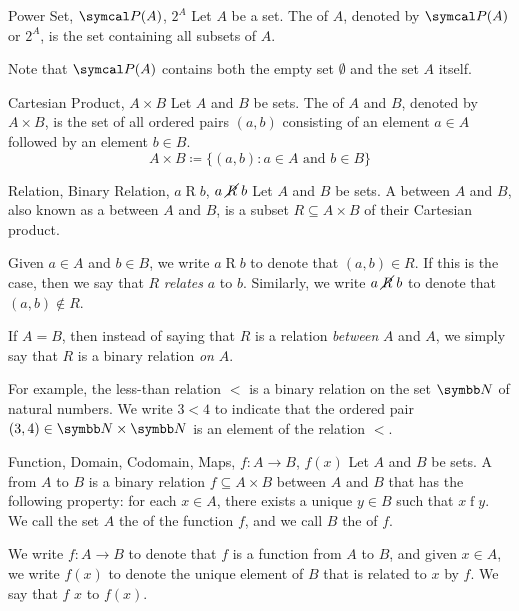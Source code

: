 \documentclass[12pt]{report}
\begin{document}
\begin{dfnbox}{Power Set, $\powerset(A)$, $2^A$}
	Let $A$ be a set. The  of $A$, denoted by $\powerset(A)$ or $2^A$, is the set containing all subsets of $A$.
\end{dfnbox}

Note that $\powerset(A)$ contains both the empty set $\emptyset$ and the set $A$ itself.

\begin{dfnbox}{Cartesian Product, $A \times B$}
	Let $A$ and $B$ be sets. The  of $A$ and $B$, denoted by $A \times B$, is the set of all ordered pairs $(a, b)$ consisting of an element $a \in A$ followed by an element $b \in B$.
	\[ A \times B \coloneq \{ (a, b) : a \in A \text{ and } b \in B \} \]
\end{dfnbox}

\begin{dfnbox}{Relation, Binary Relation, $a \mathrel{R} b$, $a \mathrel{\cancel{R}} b$}
	Let $A$ and $B$ be sets. A  between $A$ and $B$, also known as a  between $A$ and $B$, is a subset $R \subseteq A \times B$ of their Cartesian product.

	Given $a \in A$ and $b \in B$, we write $a \mathrel{R} b$ to denote that  $(a, b) \in R$. If this is the case, then we say that $R$ \textit{relates} $a$ to $b$. Similarly, we write $a \mathrel{\cancel{R}} b$ to denote that $(a, b) \notin R$.

	If $A = B$, then instead of saying that $R$ is a relation \textit{between} $A$ and $A$, we simply say that $R$ is a binary relation \textit{on} $A$.
\end{dfnbox}

For example, the less-than relation $<$ is a binary relation on the set $\N$ of natural numbers. We write $3 < 4$ to indicate that the ordered pair $(3, 4) \in \N \times \N$ is an element of the relation $<$.

\begin{dfnbox}{Function, Domain, Codomain, Maps, $f: A \to B$, $f(x)$}
	Let $A$ and $B$ be sets. A  from $A$ to $B$ is a binary relation $f \subseteq A \times B$ between $A$ and $B$ that has the following property: for each $x \in A$, there exists a unique $y \in B$ such that $x \mathrel{f} y$. We call the set $A$ the  of the function $f$, and we call $B$ the  of $f$.

	We write $f: A \to B$ to denote that $f$ is a function from $A$ to $B$, and given $x \in A$, we write $f(x)$ to denote the unique element of $B$ that is related to $x$ by $f$. We say that $f$  $x$ to $f(x)$.
\end{dfnbox}
\end{document}

